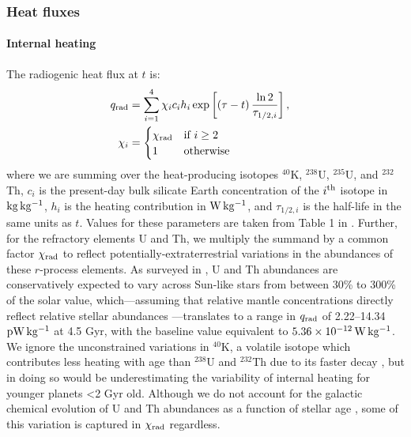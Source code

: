 

\subsubsection{Heat fluxes}

\paragraph{Internal heating}

The radiogenic heat flux at $t$ is:
\begin{align}\label{eq:q_rad}
q_{\rm rad} &= \sum_{i = 1}^4 \chi_i c_i h_i \exp\left[\left(\tau - t\right) \frac{\ln 2}{\tau_{1/2, i}}\right], &\\
\chi_i &= \nonumber
\begin{cases}
\chi_{\rm rad} & \textrm{if } i \ge 2 \\
1 & \textrm{otherwise}
\end{cases}
\end{align}
where we are summing over the heat-producing isotopes $^{40}$K, $^{238}$U, $^{235}$U, and $^{232}$Th, $c_i$ is the present-day bulk silicate Earth concentration of the $i^{\rm th}$ isotope in $\rm{kg\,kg^{-1}}$, $h_i$ is the heating contribution in $\rm{W\,kg^{-1}}$, and $\tau_{1/2, i}$ is the half-life in the same units as $t$. Values for these parameters are taken from Table 1 in \citet{oneill_distribution_2020}. Further, for the refractory elements U and Th, we multiply the summand by a common factor $\chi_{\rm rad}$ to reflect potentially-extraterrestrial variations in the abundances of these $r$-process elements. As surveyed in \citet{nimmo_radiogenic_2020}, U and Th abundances are conservatively expected to vary across Sun-like stars from between 30\% to 300\% of the solar value, which---assuming that relative mantle concentrations directly reflect relative stellar abundances \citep{thiabaud_elemental_2015, bonsor_hoststar_2021}---translates to a range in $q_{\rm rad}$ of 2.22--14.34 $\rm{pW\,kg^{-1}}$ at 4.5 Gyr, with the baseline value equivalent to $5.36 \times 10^{-12}\,\rm{W\,kg^{-1}}$. We ignore the unconstrained variations in $^{40}$K, a volatile isotope which contributes less heating with age than $^{238}$U and $^{232}$Th due to its faster decay \citep[$^{40}$K decay represents $\sim$15\% of Earth's mantle radiogenic heating today;][]{jaupart_temperatures_2015, oneill_distribution_2020}, but in doing so would be underestimating the variability of internal heating for younger planets \textless2 Gyr old. Although we do not account for the galactic chemical evolution of U and Th abundances as a function of stellar age \citep{frank_radiogenic_2014}, some of this variation is captured in $\chi_{\rm rad}$ regardless. %

